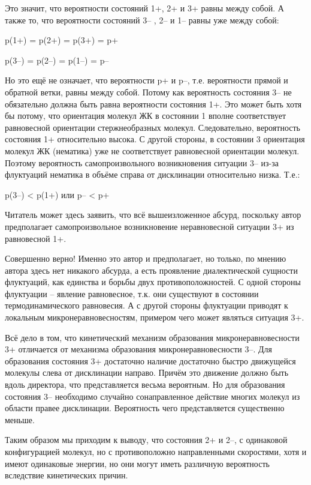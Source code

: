 \documentclass[11pt]{article}
\begin{document}
Это значит, что вероятности состояний 1+, 2+ и 3+ равны между собой. А
также то, что вероятности состояний 3-- , 2-- и 1-- равны уже между
собой:

p(1+) = p(2+) = p(3+) = p+

p(3--) = p(2--) = p(1--) = p--

Но это ещё не означает, что вероятности p+ и p--, т.е. вероятности
прямой и обратной ветки, равны между собой. Потому как вероятность
состояния 3-- не обязательно должна быть равна вероятности состояния 1+.
Это может быть хотя бы потому, что ориентация молекул ЖК в состоянии 1
вполне соответствует равновесной ориентации стержнеобразных молекул.
Следовательно, вероятность состояния 1+ относительно высока. С другой
стороны, в состоянии 3 ориентация молекул ЖК (нематика) уже не
соответствует равновесной ориентации молекул. Поэтому вероятность
самопроизвольного возникновения ситуации 3-- из-за флуктуаций нематика в
объёме справа от дисклинации относительно низка. Т.е.:

p(3--) \textless{} p(1+) или p-- \textless{} p+

Читатель может здесь заявить, что всё вышеизложенное абсурд, поскольку
автор предполагает самопроизвольное возникновение неравновесной ситуации
3+ из равновесной 1+.

Совершенно верно! Именно это автор и предполагает, но только, по мнению
автора здесь нет никакого абсурда, а есть проявление диалектической
сущности флуктуаций, как единства и борьбы двух противоположностей. С
одной стороны флуктуации -- явление равновесное, т.к. они существуют в
состоянии термодинамического равновесия. А с другой стороны флуктуации
приводят к локальным микронеравновесностям, примером чего может являться
ситуация 3+.

Всё дело в том, что кинетический механизм образования
микронеравновесности 3+ отличается от механизма образования
микронеравновесности 3--. Для образования состояния 3+ достаточно
наличие достаточно быстро движущейся молекулы слева от дисклинации
направо. Причём это движение должно быть вдоль директора, что
представляется весьма вероятным. Но для образования состояния 3--
необходимо случайно сонаправленное действие многих молекул из области
правее дисклинации. Вероятность чего представляется существенно меньше.

Таким образом мы приходим к выводу, что состояния 2+ и 2--, с одинаковой
конфигурацией молекул, но с противоположно направленными скоростями,
хотя и имеют одинаковые энергии, но они могут иметь различную
вероятность вследствие кинетических причин.
\end{document}
